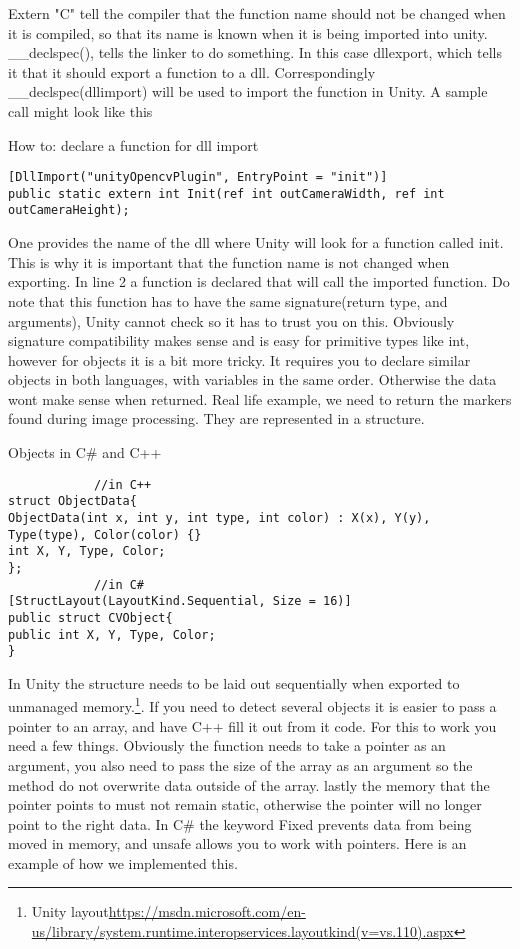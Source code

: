 Extern "C" tell the compiler that the function name should not be changed when it is compiled, so that its name is known when it is being imported into unity. \_\_declspec(), tells the linker to do something. In this case dllexport, which tells it that it should export a function to a dll. Correspondingly \_\_declspec(dllimport) will be used to import the function in Unity. A sample call might look like this\\
\begin{listing}[H]
	\caption{How to: declare a function for dll import}
	\label{listing:dllImport}
	\begin{verbatim}
[DllImport("unityOpencvPlugin", EntryPoint = "init")]
public static extern int Init(ref int outCameraWidth, ref int outCameraHeight);
	\end{verbatim}
\end{listing}
One provides the name of the dll where Unity will look for a function called init. This is why it is important that the function name is not changed when exporting. In line 2 a function is declared that will call the imported function. Do note that this function has to have the same signature(return type, and arguments), Unity cannot check so it has to trust you on this. Obviously signature compatibility makes sense and is easy for primitive types like int, however for objects it is a bit more tricky. It requires you to declare similar objects in both languages, with variables in the same order. Otherwise the data wont make sense when returned. Real life example, we need to return the markers found during image processing. They are represented in a structure. 
\begin{listing}[H]
	\caption{Objects in C\# and C++}
	\label{listing:objects}
	\begin{verbatim}
			//in C++
struct ObjectData{
ObjectData(int x, int y, int type, int color) : X(x), Y(y), Type(type), Color(color) {}
int X, Y, Type, Color;
};
			//in C#	
[StructLayout(LayoutKind.Sequential, Size = 16)]
public struct CVObject{
public int X, Y, Type, Color;
}
	\end{verbatim}
\end{listing}
In Unity the structure needs to be laid out sequentially when exported to unmanaged memory.\footnote{Unity layout\url{https://msdn.microsoft.com/en-us/library/system.runtime.interopservices.layoutkind(v=vs.110).aspx}}. If you need to detect several objects it is easier to pass a pointer to an array, and have C++ fill it out from it code. For this to work you need a few things. Obviously the function needs to take a pointer as an argument, you also need to pass the size of the array as an argument so the method do not overwrite data outside of the array. lastly the memory that the pointer points to must not remain static, otherwise the pointer will no longer point to the right data. In C\# the keyword Fixed prevents data from being moved in memory, and unsafe allows you to work with pointers. Here is an example of how we implemented this.
